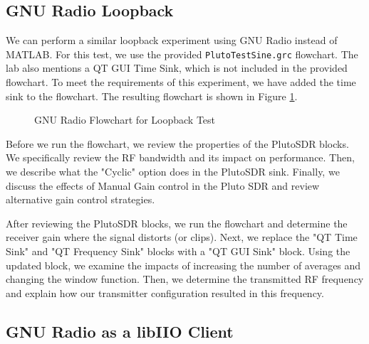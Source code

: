 \documentclass{article}
\begin{document}
\subsection{GNU Radio Loopback}
\label{section::gnu_radio_loopback}

We can perform a similar loopback experiment using GNU Radio instead of MATLAB. For this test, we use the provided \texttt{PlutoTestSine.grc} flowchart. The lab also mentions a QT GUI Time Sink, which is not included in the provided flowchart. To meet the requirements of this experiment, we have added the time sink to the flowchart. The resulting flowchart is shown in Figure \ref{fig::gnu_radio_loopback_flowchart}.

\begin{figure}[H]
	\centerline{}
	\caption{GNU Radio Flowchart for Loopback Test}
	\label{fig::gnu_radio_loopback_flowchart}
\end{figure}

Before we run the flowchart, we review the properties of the PlutoSDR blocks. We specifically review the RF bandwidth and its impact on performance. Then, we describe what the "Cyclic" option does in the PlutoSDR sink. Finally, we discuss the effects of Manual Gain control in the Pluto SDR and review alternative gain control strategies.

After reviewing the PlutoSDR blocks, we run the flowchart and determine the receiver gain where the signal distorts (or clips). Next, we replace the "QT Time Sink" and "QT Frequency Sink" blocks with a "QT GUI Sink" block. Using the updated block, we examine the impacts of increasing the number of averages and changing the window function. Then, we determine the transmitted RF frequency and explain how our transmitter configuration resulted in this frequency.

\subsection{GNU Radio as a libIIO Client}
\end{document}
